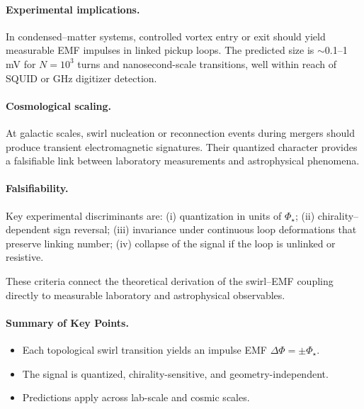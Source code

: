\documentclass[reprint,aps,onecolumn,nofootinbib]{revtex4-2}
\begin{document}
        \paragraph*{Experimental implications.}
        In condensed–matter systems, controlled vortex entry or exit should yield measurable EMF impulses in
        linked pickup loops. The predicted size is $\sim$0.1–1 mV for $N=10^3$ turns and nanosecond-scale transitions,
        well within reach of SQUID or GHz digitizer detection.

        \paragraph*{Cosmological scaling.}
        At galactic scales, swirl nucleation or reconnection events during mergers should produce transient
        electromagnetic signatures. Their quantized character provides a falsifiable link between laboratory
        measurements and astrophysical phenomena.

        \paragraph*{Falsifiability.}
        Key experimental discriminants are: (i) quantization in units of $\Phi_\star$; (ii) chirality–dependent
        sign reversal; (iii) invariance under continuous loop deformations that preserve linking number; (iv)
        collapse of the signal if the loop is unlinked or resistive.

        These criteria connect the theoretical derivation of the swirl–EMF coupling directly to measurable
        laboratory and astrophysical observables.

        \paragraph*{Summary of Key Points.}
        \begin{itemize}
          \item Each topological swirl transition yields an impulse EMF \( \Delta \Phi = \pm \Phi_\star \).
          \item The signal is quantized, chirality-sensitive, and geometry-independent.
          \item Predictions apply across lab-scale and cosmic scales.
        \end{itemize}




\end{document}
